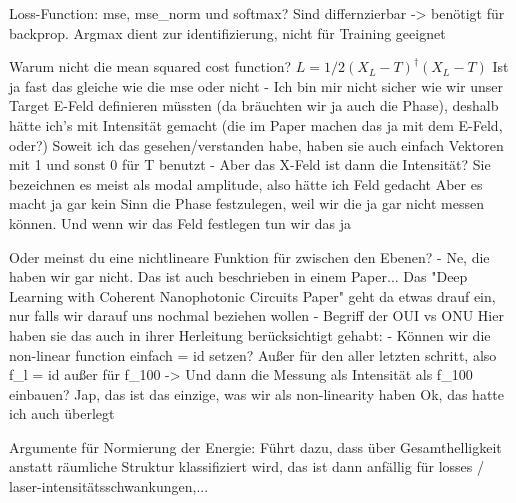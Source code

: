 
 Loss-Function: mse, mse\_norm und softmax? Sind differnzierbar -> benötigt für backprop. Argmax dient zur identifizierung, nicht für Training geeignet

 Warum nicht die mean squared cost function?\cite{hughesTrainingPhotonicNeural2018}
 $ L = 1/2 (X_L-T)^\dagger (X_L-T) $
 Ist ja fast das gleiche wie die mse oder nicht
 - Ich bin mir nicht sicher wie wir unser Target E-Feld definieren müssten (da bräuchten wir ja auch die Phase), deshalb hätte ich's mit Intensität gemacht (die im Paper machen das ja mit dem E-Feld, oder?)
 Soweit ich das gesehen/verstanden habe, haben sie auch einfach Vektoren mit 1 und sonst 0 für T benutzt
 - Aber das X-Feld ist dann die Intensität?
 Sie bezeichnen es meist als modal amplitude, also hätte ich Feld gedacht
 Aber es macht ja gar kein Sinn die Phase festzulegen, weil wir die ja gar nicht messen können. Und wenn wir das Feld festlegen tun wir das ja

 Oder meinst du eine nichtlineare Funktion für zwischen den Ebenen?
- Ne, die haben wir gar nicht. Das ist auch beschrieben in einem Paper... Das "Deep Learning with Coherent Nanophotonic Circuits Paper" \cite{shenDeepLearningCoherent2017} geht da etwas drauf ein, nur falls wir darauf uns nochmal beziehen wollen - Begriff der OUI vs ONU
Hier haben sie das auch in ihrer Herleitung berücksichtigt gehabt: \cite{Hughes2018-optica}
- Können wir die non-linear function einfach = id setzen?
Außer für den aller letzten schritt, also f\_l = id außer für f\_100 -> Und dann die Messung als Intensität als f\_100 einbauen?
Jap, das ist das einzige, was wir als non-linearity haben
Ok, das hatte ich auch überlegt

 Argumente für Normierung der Energie: Führt dazu, dass über Gesamthelligkeit anstatt räumliche Struktur klassifiziert wird, das ist dann anfällig für losses / laser-intensitätsschwankungen,...

